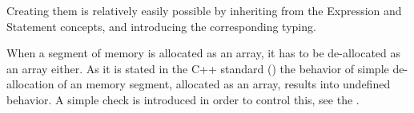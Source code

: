 Creating them is relatively easily possible by inheriting from the Expression and Statement concepts,
and introducing the corresponding typing.

When a segment of memory is allocated as an array, it has to be de-allocated as an array either.
As it is stated in the C++ standard (\cite{cpp11}) the behavior of simple de-allocation of an 
memory segment, allocated as an array, results into undefined behavior. A simple check is introduced
in order to control this, see the . 





%
%








